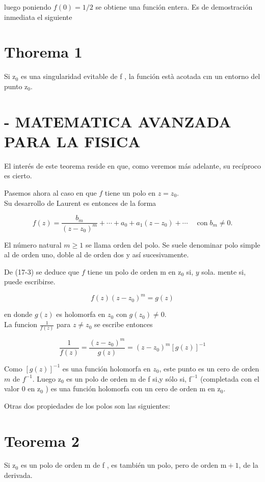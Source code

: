 \documentclass[10pt]{article}
\theoremstyle{plain}
\theoremstyle{definition}
\theoremstyle{remark}
\begin{document}
luego poniendo $f(0)=1 / 2$ se obtiene una función entera. Es de demostración inmediata el siguiente

\section*{Thorema 1}
Si $\mathrm{z}_0$ es una singularidad evitable de f , la función està acotada cın un entorno del punto $\mathrm{z}_{0}$.

\section*{- MATEMATICA AVANZADA PARA LA FISICA}
El interés de este teorema reside en que, como veremos más adelante, su recíproco es cierto.

Pasemos ahora al caso en que $f$ tiene un polo en $z=z_{0}$.\\
Su desarrollo de Laurent es entonces de la forma

$$
f(z)=\frac{b_{m}}{\left(z-z_{0}\right)^{m}}+\cdots+a_{0}+a_{1}\left(z-z_{0}\right)+\cdots \quad \operatorname{con} b_{m} \neq 0 .
$$

El número natural $m \geqslant 1$ se llama orden del polo. Se suele denominar polo simple al de orden uno, doble al de orden dos y así sucesivamente.

De (17-3) se deduce que $f$ tiene un polo de orden m en $\mathrm{z}_{0}$ si, $y$ sola. mente si, puede escribirse.


\begin{equation*}
f(z)\left(z-z_{0}\right)^{m}=g(z) \tag{17-4}
\end{equation*}


en donde $g(z)$ es holomorfa en $z_{0}$ con $g\left(z_{0}\right) \neq 0$.\\
La funcion $\frac{1}{f(z)}$ para $z \neq z_{0}$ se escribe entonces

$$
\frac{1}{f(z)}=\frac{\left(z-z_{0}\right)^{m}}{g(z)}=\left(z-z_{0}\right)^{m}[g(z)]^{-1}
$$

Como $[g(z)]^{-1}$ es una función holomorfa en $z_{0}$, este punto es un cero de orden $m$ de $f^{-1}$. Luego $\mathrm{z}_{0}$ es un polo de orden m de f si,y sólo si, $\mathrm{f}^{-1}$ (completada con el valor 0 en $\mathrm{z}_{0}$ ) es una función holomorfa con un cero de orden m en $\mathrm{z}_{0}$.

Otras dos propiedades de los polos son las siguientes:

\section*{Teorema 2}
Si $\mathrm{z}_{0}$ es un polo de orden m de f , es también un polo, pero de orden $\mathrm{m}+1$, de la derivada.
\end{document}
